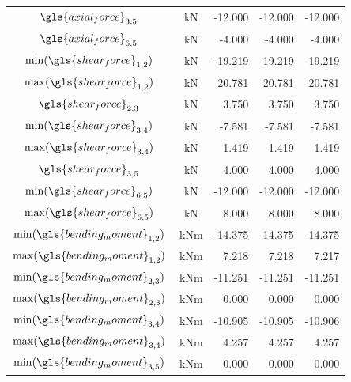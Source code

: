 \begin{table}[H]
\begin{tabular}{ccrrr}
            $\gls{axial_force}_{3,5}$ & $\SI{}{\kilo\newton}$ & -12.000 & -12.000 & -12.000 \\
            $\gls{axial_force}_{6,5}$ & $\SI{}{\kilo\newton}$ & -4.000 & -4.000 & -4.000 \\
            $\min(\gls{shear_force}_{1,2})$ & $\SI{}{\kilo\newton}$ & -19.219 & -19.219 & -19.219 \\
            $\max(\gls{shear_force}_{1,2})$ & $\SI{}{\kilo\newton}$ & 20.781 & 20.781 & 20.781 \\
            $\gls{shear_force}_{2,3}$ & $\SI{}{\kilo\newton}$ & 3.750 & 3.750 & 3.750 \\
            $\min(\gls{shear_force}_{3,4})$ & $\SI{}{\kilo\newton}$ & -7.581 & -7.581 & -7.581 \\
            $\max(\gls{shear_force}_{3,4})$ & $\SI{}{\kilo\newton}$ & 1.419 & 1.419 & 1.419 \\
            $\gls{shear_force}_{3,5}$ & $\SI{}{\kilo\newton}$ & 4.000 & 4.000 & 4.000 \\
            $\min(\gls{shear_force}_{6,5})$ & $\SI{}{\kilo\newton}$ & -12.000 & -12.000 & -12.000 \\
            $\max(\gls{shear_force}_{6,5})$ & $\SI{}{\kilo\newton}$ & 8.000 & 8.000 & 8.000 \\
            $\min(\gls{bending_moment}_{1,2})$ & $\SI{}{\kilo\newton\meter}$ & -14.375 & -14.375 & -14.375 \\
            \rowcolor{red!8}$\max(\gls{bending_moment}_{1,2})$ & $\SI{}{\kilo\newton\meter}$ & 7.218 & 7.218 & 7.217 \\
            $\min(\gls{bending_moment}_{2,3})$ & $\SI{}{\kilo\newton\meter}$ & -11.251 & -11.251 & -11.251 \\
            $\max(\gls{bending_moment}_{2,3})$ & $\SI{}{\kilo\newton\meter}$ & 0.000 & 0.000 & 0.000 \\
            \rowcolor{red!8}$\min(\gls{bending_moment}_{3,4})$ & $\SI{}{\kilo\newton\meter}$ & -10.905 & -10.905 & -10.906 \\
            $\max(\gls{bending_moment}_{3,4})$ & $\SI{}{\kilo\newton\meter}$ & 4.257 & 4.257 & 4.257 \\
            $\min(\gls{bending_moment}_{3,5})$ & $\SI{}{\kilo\newton\meter}$ & 0.000 & 0.000 & 0.000 \\

\end{tabular}
\end{table}
